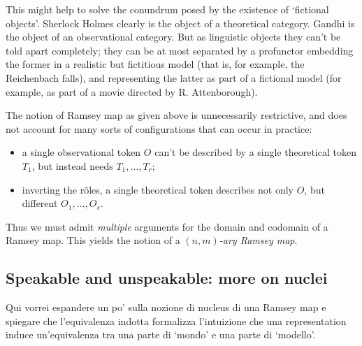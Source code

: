 This might help to solve the conundrum posed by the existence of `fictional objects'. Sherlock Holmes clearly is the object of a theoretical category. Gandhi is the object of an observational category. But as linguistic objects they can't be told apart completely; they can be at most separated by a profunctor embedding the former in a realistic but fictitious model (that is, for example, the Reichenbach falls), and representing the latter as part of a fictional model (for example, as part of a movie directed by R. Attenborough).

The notion of Ramsey map as given above is unnecessarily restrictive, and does not account for many sorts of configurations that can occur in practice:
\begin{itemize}
	\item a single observational token $O$ can't be described by a single theoretical token $T_1$, but instead needs $T_1,\dots,T_r$;
	\item inverting the r\^oles, a single theoretical token describes not only $O$, but different $O_1,\dots,O_s$.
\end{itemize}
Thus we must admit \emph{multiple} arguments for the domain and codomain of a Ramsey map. This yields the notion of a \emph{$(n,m)$-ary Ramsey map}.
\subsection{Speakable and unspeakable: more on nuclei}
Qui vorrei espandere un po' sulla nozione di nucleus di una Ramsey map e spiegare che l'equivalenza indotta formalizza l'intuizione che una representation induce un'equivalenza tra una parte di `mondo' e una parte di `modello'.